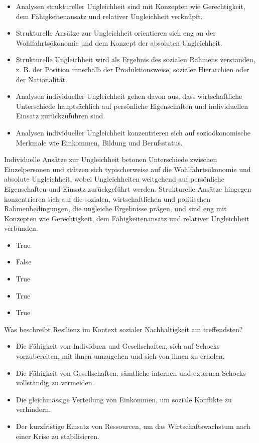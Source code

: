 \documentclass[
  nswissgerman,
  a4paper,
  DIV=11,
  numbers=noendperiod,
  oneside,
  openany]{scrreprt}
\providecommand{\tightlist}{%
  \setlength{\itemsep}{0pt}\setlength{\parskip}{0pt}}
\begin{document}
\begin{itemize}
\tightlist
\item[$\square$]
  Analysen struktureller Ungleichheit sind mit Konzepten wie
  Gerechtigkeit, dem Fähigkeitenansatz und relativer Ungleichheit
  verknüpft.
\item[$\square$]
  Strukturelle Ansätze zur Ungleichheit orientieren sich eng an der
  Wohlfahrtsökonomie und dem Konzept der absoluten Ungleichheit.
\item[$\square$]
  Strukturelle Ungleichheit wird als Ergebnis des sozialen Rahmens
  verstanden, z. B. der Position innerhalb der Produktionsweise,
  sozialer Hierarchien oder der Nationalität.
\item[$\square$]
  Analysen individueller Ungleichheit gehen davon aus, dass
  wirtschaftliche Unterschiede hauptsächlich auf persönliche
  Eigenschaften und individuellen Einsatz zurückzuführen sind.
\item[$\square$]
  Analysen individueller Ungleichheit konzentrieren sich auf
  sozioökonomische Merkmale wie Einkommen, Bildung und Berufsstatus.
\end{itemize}

Individuelle Ansätze zur Ungleichheit betonen Unterschiede zwischen
Einzelpersonen und stützen sich typischerweise auf die
Wohlfahrtsökonomie und absolute Ungleichheit, wobei Ungleichheiten
weitgehend auf persönliche Eigenschaften und Einsatz zurückgeführt
werden. Strukturelle Ansätze hingegen konzentrieren sich auf die
sozialen, wirtschaftlichen und politischen Rahmenbedingungen, die
ungleiche Ergebnisse prägen, und sind eng mit Konzepten wie
Gerechtigkeit, dem Fähigkeitenansatz und relativer Ungleichheit
verbunden.

\begin{itemize}
\tightlist
\item
  True
\item
  False
\item
  True
\item
  True
\item
  True
\end{itemize}

Was beschreibt Resilienz im Kontext sozialer Nachhaltigkeit am
treffendsten?

\begin{itemize}
\tightlist
\item[$\square$]
  Die Fähigkeit von Individuen und Gesellschaften, sich auf Schocks
  vorzubereiten, mit ihnen umzugehen und sich von ihnen zu erholen.
\item[$\square$]
  Die Fähigkeit von Gesellschaften, sämtliche internen und externen
  Schocks vollständig zu vermeiden.
\item[$\square$]
  Die gleichmässige Verteilung von Einkommen, um soziale Konflikte zu
  verhindern.
\item[$\square$]
  Der kurzfristige Einsatz von Ressourcen, um das Wirtschaftswachstum
  nach einer Krise zu stabilisieren.
\end{itemize}
\end{document}
